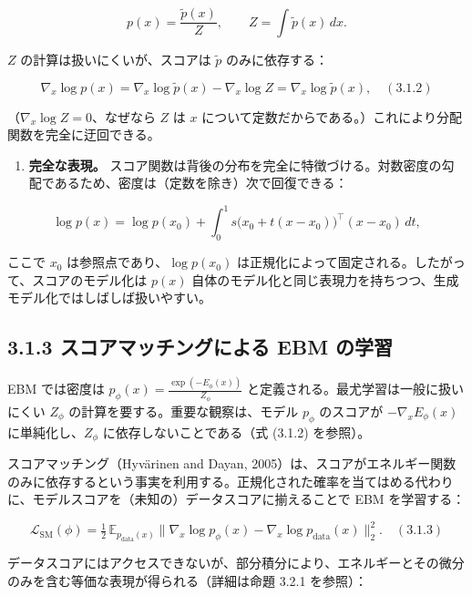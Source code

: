 \[
p(x) = \frac{\tilde{p}(x)}{Z}, \qquad Z = \int \tilde{p}(x)\, dx.
\]


$Z$ の計算は扱いにくいが、スコアは $\tilde{p}$ のみに依存する：

\[
\nabla_x \log p(x) = \nabla_x \log \tilde{p}(x) - \nabla_x \log Z = \nabla_x \log \tilde{p}(x),\quad (3.1.2)
\]


（$\nabla_x \log Z = 0$、なぜなら $Z$ は $x$ について定数だからである。）これにより分配関数を完全に迂回できる。

\begin{enumerate}
\item \textbf{完全な表現。} スコア関数は背後の分布を完全に特徴づける。対数密度の勾配であるため、密度は（定数を除き）次で回復できる：
\end{enumerate}


\[
\log p(x) = \log p(x_0) + \int_0^1 s\!\bigl(x_0 + t(x - x_0)\bigr)^\top (x - x_0)\, dt,
\]


ここで $x_0$ は参照点であり、$\log p(x_0)$ は正規化によって固定される。したがって、スコアのモデル化は $p(x)$ 自体のモデル化と同じ表現力を持ちつつ、生成モデル化ではしばしば扱いやすい。

\subsection*{3.1.3 スコアマッチングによる EBM の学習}


EBM では密度は $p_\phi(x) = \frac{\exp(-E_\phi(x))}{Z_\phi}$ と定義される。最尤学習は一般に扱いにくい $Z_\phi$ の計算を要する。重要な観察は、モデル $p_\phi$ のスコアが $-\nabla_x E_\phi(x)$ に単純化し、$Z_\phi$ に依存しないことである（式 (3.1.2) を参照）。

スコアマッチング（Hyvärinen and Dayan, 2005）は、スコアがエネルギー関数のみに依存するという事実を利用する。正規化された確率を当てはめる代わりに、モデルスコアを（未知の）データスコアに揃えることで EBM を学習する：

\[
\mathcal{L}_{\mathrm{SM}}(\phi) = \tfrac{1}{2}\,\mathbb{E}_{p_{\mathrm{data}}(x)}\bigl\|\nabla_x \log p_\phi(x) - \nabla_x \log p_{\mathrm{data}}(x)\bigr\|_2^2.\quad (3.1.3)
\]




データスコアにはアクセスできないが、部分積分により、エネルギーとその微分のみを含む等価な表現が得られる（詳細は命題 3.2.1 を参照）：

